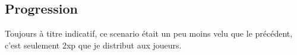 \subsection{Progression}
Toujours à titre indicatif, ce scenario était un peu moins velu que le précédent, c’est seulement 2xp que je distribut aux joueurs.




